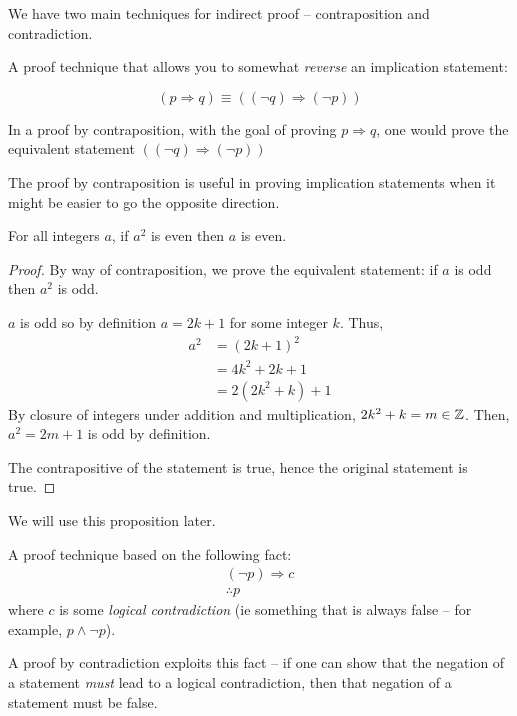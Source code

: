 \documentclass[main.tex]{subfiles}
\begin{document}
We have two main techniques for indirect proof -- contraposition and contradiction.

\begin{defn}
	A proof technique that allows you to somewhat \textit{reverse} an implication statement:
	
	\[(p \Rightarrow q) \equiv ((\lnot q) \Rightarrow (\lnot p))\]
	
	In a proof by contraposition, with the goal of proving \(p \Rightarrow q\), one would prove the equivalent statement \(((\lnot q) \Rightarrow (\lnot p))\)
\end{defn}

The proof by contraposition is useful in proving implication statements when it might be easier to go the opposite direction.

\begin{prop}\label{prop3.x:eucl-arg-lemma}
	For all integers \(a\), if \(a^2\) is even then \(a\) is even.
\end{prop}

\begin{proof}
	By way of contraposition, we prove the equivalent statement: if \(a\) is odd then \(a^2\) is odd.
	
	\(a\) is odd so by definition \(a = 2k+1\) for some integer \(k\). Thus,
	\begin{align*}
	a^2 &= (2k+1)^2 \\ &= 4k^2 + 2k + 1 \\ &= 2(2k^2 + k) + 1
	\end{align*}
	By closure of integers under addition and multiplication, \(2k^2 + k = m \in \mathbb{Z}\). Then, \(a^2 = 2m+1\) is odd by definition.
	
	The contrapositive of the statement is true, hence the original statement is true.
\end{proof}

We will use this proposition later. %


\begin{defn}
	A proof technique based on the following fact:
	\begin{align*}
	(\lnot p) \Rightarrow c \\
	\therefore p
	\end{align*}
	where \(c\) is some \textit{logical contradiction} (ie something that is always false -- for example, \(p \land \lnot p\)).
	
	A proof by contradiction exploits this fact -- if one can show that the negation of a statement \textit{must} lead to a logical contradiction, then that negation of a statement must be false.
\end{defn}
\end{document}
